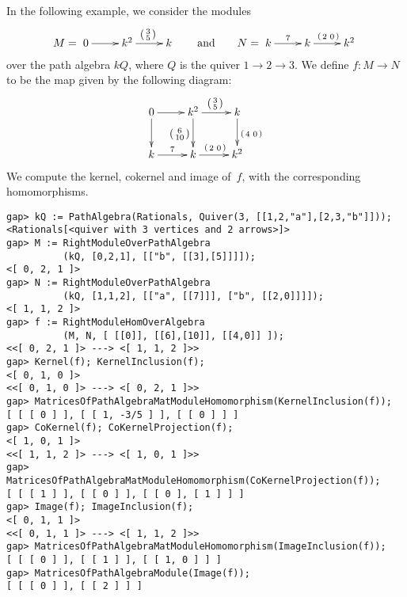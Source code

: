 \documentclass{amsart}
\theoremstyle{definition}
\newcommand{\vv}[2]{\left( \begin{smallmatrix} #1 & #2 \end{smallmatrix} \right)}
\theoremstyle{theoretic}
\begin{document}
In the following example, we consider the modules
\[
M = \xymatrix{ 0 \ar[r] &
               k^2 \ar[r]^{\left( \begin{smallmatrix} 3\\5 \end{smallmatrix} \right)} &
               k }
\qquad\text{and}\qquad
N = \xymatrix{ k \ar[r]^7 &
               k \ar[r]^{\vv{2}{0}} &
               k^2 }
\]
over the path algebra $kQ$, where $Q$ is the quiver $1 \to 2 \to 3$.
We define $f \colon M \to N$ to be the map given by the following
diagram:
\[
\xymatrix{
0 \ar[r]\ar[d] &
k^2 \ar[r]^{\left( \begin{smallmatrix} 3\\5 \end{smallmatrix} \right)}
    \ar[d]_{\left( \begin{smallmatrix} 6\\10 \end{smallmatrix} \right)} &
k \ar[d]^{\vv{4}{0}}
\\
k \ar[r]^7 &
k \ar[r]^{\vv{2}{0}} &
k^2
}
\]
We compute the kernel, cokernel and image of~$f$, with the
corresponding homomorphisms.

\begin{verbatim}
gap> kQ := PathAlgebra(Rationals, Quiver(3, [[1,2,"a"],[2,3,"b"]]));
<Rationals[<quiver with 3 vertices and 2 arrows>]>
gap> M := RightModuleOverPathAlgebra
          (kQ, [0,2,1], [["b", [[3],[5]]]]);
<[ 0, 2, 1 ]>
gap> N := RightModuleOverPathAlgebra
          (kQ, [1,1,2], [["a", [[7]]], ["b", [[2,0]]]]);
<[ 1, 1, 2 ]>
gap> f := RightModuleHomOverAlgebra
          (M, N, [ [[0]], [[6],[10]], [[4,0]] ]);
<<[ 0, 2, 1 ]> ---> <[ 1, 1, 2 ]>>
gap> Kernel(f); KernelInclusion(f);
<[ 0, 1, 0 ]>
<<[ 0, 1, 0 ]> ---> <[ 0, 2, 1 ]>>
gap> MatricesOfPathAlgebraMatModuleHomomorphism(KernelInclusion(f));
[ [ [ 0 ] ], [ [ 1, -3/5 ] ], [ [ 0 ] ] ]
gap> CoKernel(f); CoKernelProjection(f);
<[ 1, 0, 1 ]>
<<[ 1, 1, 2 ]> ---> <[ 1, 0, 1 ]>>
gap> MatricesOfPathAlgebraMatModuleHomomorphism(CoKernelProjection(f));
[ [ [ 1 ] ], [ [ 0 ] ], [ [ 0 ], [ 1 ] ] ]
gap> Image(f); ImageInclusion(f);
<[ 0, 1, 1 ]>
<<[ 0, 1, 1 ]> ---> <[ 1, 1, 2 ]>>
gap> MatricesOfPathAlgebraMatModuleHomomorphism(ImageInclusion(f));
[ [ [ 0 ] ], [ [ 1 ] ], [ [ 1, 0 ] ] ]
gap> MatricesOfPathAlgebraModule(Image(f));
[ [ [ 0 ] ], [ [ 2 ] ] ]
\end{verbatim}
\end{document}
